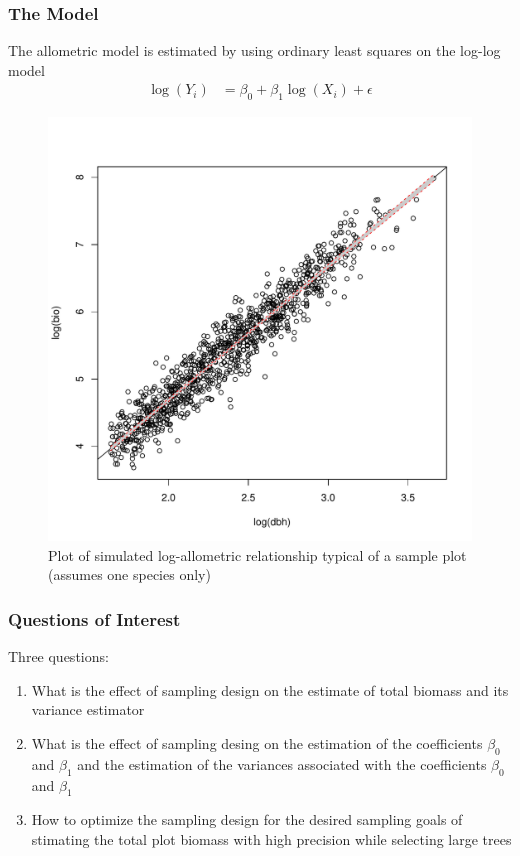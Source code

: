 \documentclass{beamer}
\begin{document}
\begin{frame}
  \frametitle{The Model}
The allometric model is estimated by using ordinary least squares on the log-log model\\
  \begin{align}
  \label{2}
    \log(Y_i) & = \beta_0 + \beta_1 \log(X_i) + \epsilon
  \end{align}
  \begin{figure}
    \centering
    \caption{Plot of simulated log-allometric relationship typical of a sample plot (assumes one species only)}
    \includegraphics[scale = 0.15]{dbhLogModel}
  \end{figure}
\end{frame}
%
\begin{frame}
  \frametitle{Questions of Interest}
  Three questions:
  \begin{enumerate}
  \item What is the effect of sampling design on the estimate of total biomass and its variance estimator \vspace{3mm}
  \item What is the effect of sampling desing on the estimation of the coefficients $\beta_0$ and $\beta_1$ and the estimation of the variances associated with the coefficients $\beta_0$ and $\beta_1$ \vspace{3mm}
  \item How to optimize the sampling design for the desired sampling goals of stimating the total plot biomass with high precision while selecting large trees
  \end{enumerate}
\end{frame}
\end{document}
